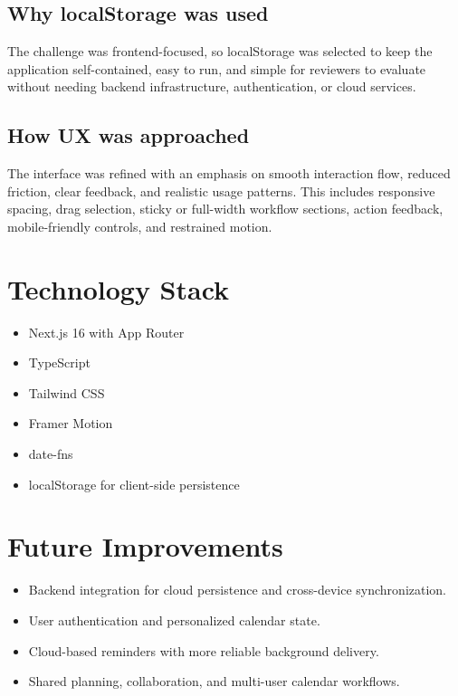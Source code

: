 \documentclass[11pt,a4paper]{article}
\begin{document}
\subsection{Why localStorage was used}

The challenge was frontend-focused, so localStorage was selected to keep the application
self-contained, easy to run, and simple for reviewers to evaluate without needing backend
infrastructure, authentication, or cloud services.

\subsection{How UX was approached}

The interface was refined with an emphasis on smooth interaction flow, reduced friction, clear
feedback, and realistic usage patterns. This includes responsive spacing, drag selection, sticky
or full-width workflow sections, action feedback, mobile-friendly controls, and restrained motion.

\section{Technology Stack}

\begin{tcolorbox}[
  colback=reportsoft,
  colframe=reportline,
  boxrule=0.6pt,
  arc=3mm
]
\begin{itemize}[leftmargin=1.4em]
  \item Next.js 16 with App Router
  \item TypeScript
  \item Tailwind CSS
  \item Framer Motion
  \item date-fns
  \item localStorage for client-side persistence
\end{itemize}
\end{tcolorbox}

\section{Future Improvements}

\begin{itemize}[leftmargin=1.4em]
  \item Backend integration for cloud persistence and cross-device synchronization.
  \item User authentication and personalized calendar state.
  \item Cloud-based reminders with more reliable background delivery.
  \item Shared planning, collaboration, and multi-user calendar workflows.
\end{itemize}
\end{document}
